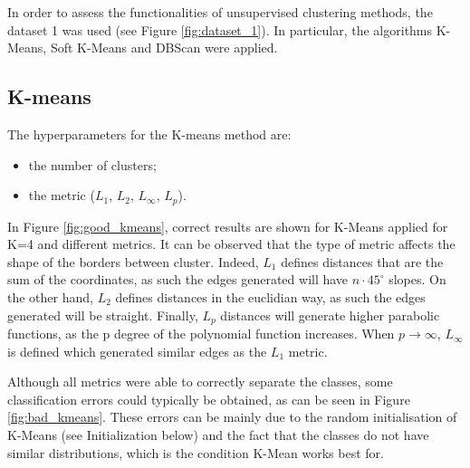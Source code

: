 \documentclass[a4paper,10pt]{article}
\begin{document}

In order to assess the functionalities of unsupervised clustering methods, the dataset 1 was used (see Figure \ref{fig:dataset_1}). In particular, the algorithms K-Means, Soft K-Means and DBScan were applied.

\subsection{K-means}

The hyperparameters for the K-means method are:
\begin{itemize}
\item the number of clusters;
\item the metric ($L_1$, $L_2$, $L_{\infty}$, $L_p$).
\end{itemize}

In Figure \ref{fig:good_kmeans}, correct results are shown for K-Means applied for K=4 and different metrics. It can be observed that the type of metric affects the shape of the borders between cluster. Indeed, $L_1$ defines distances that are the sum of the coordinates, as such the edges generated will have $n\cdot 45^{\circ}$ slopes. On the other hand, $L_2$ defines distances in the euclidian way, as such the edges generated will be straight. Finally, $L_p$ distances will generate higher parabolic functions, as the p degree of the polynomial function increases. When $p\rightarrow\infty$, $L_{\infty}$ is defined which generated similar edges as the $L_1$ metric. 

Although all metrics were able to correctly separate the classes, some classification errors could typically be obtained, as can be seen in Figure \ref{fig:bad_kmeans}. These errors can be mainly due to the random initialisation of K-Means (see Initialization below) and the fact that the classes do not have similar distributions, which is the condition K-Mean works best for. 
\end{document}
